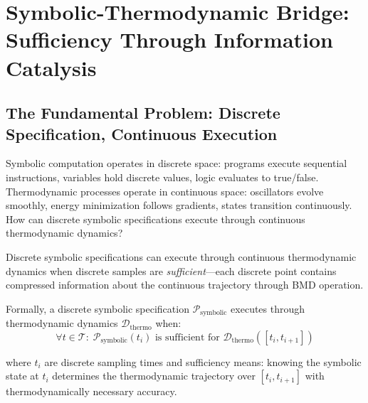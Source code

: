 \section{Symbolic-Thermodynamic Bridge: Sufficiency Through Information Catalysis}

\subsection{The Fundamental Problem: Discrete Specification, Continuous Execution}

Symbolic computation operates in discrete space: programs execute sequential instructions, variables hold discrete values, logic evaluates to true/false. Thermodynamic processes operate in continuous space: oscillators evolve smoothly, energy minimization follows gradients, states transition continuously. How can discrete symbolic specifications execute through continuous thermodynamic dynamics?

\begin{theorem}
\label{thm:sufficiency_bridge}
Discrete symbolic specifications can execute through continuous thermodynamic dynamics when discrete samples are \textit{sufficient}—each discrete point contains compressed information about the continuous trajectory through BMD operation.

Formally, a discrete symbolic specification $\mathcal{P}_{\text{symbolic}}$ executes through thermodynamic dynamics $\mathcal{D}_{\text{thermo}}$ when:
\begin{equation}
\forall t \in \mathcal{T}: \; \mathcal{P}_{\text{symbolic}}(t_i) \text{ is sufficient for } \mathcal{D}_{\text{thermo}}([t_i, t_{i+1}])
\end{equation}

where $t_i$ are discrete sampling times and sufficiency means: knowing the symbolic state at $t_i$ determines the thermodynamic trajectory over $[t_i, t_{i+1}]$ with thermodynamically necessary accuracy.
\end{theorem}

